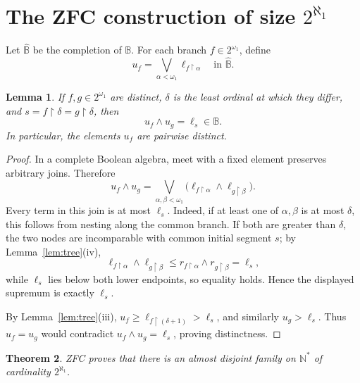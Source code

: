 \documentclass[11pt]{article}
\newtheorem{theorem}{Theorem}[section]
\newtheorem{lemma}[theorem]{Lemma}
\theoremstyle{definition}
\theoremstyle{remark}
\newcommand{\B}{\mathbb B}
\newcommand{\wideB}{\widehat{\mathbb B}}
\newcommand{\restr}{\mathbin{\upharpoonright}}
\begin{document}
\section{The ZFC construction of size
\texorpdfstring{\(2^{\aleph_1}\)}{2 to the aleph1}}

Let \(\wideB\) be the completion of \(\B\).  For each branch
\(f\in2^{\omega_1}\), define
\[
  u_f=\bigvee_{\alpha<\omega_1}\ell_{f\restr\alpha}
  \quad\text{in }\wideB.
\]

\begin{lemma}\label{lem:branchmeet}
If \(f,g\in2^{\omega_1}\) are distinct, \(\delta\) is the least ordinal at
which they differ, and \(s=f\restr\delta=g\restr\delta\), then
\[
  u_f\wedge u_g=\ell_s\in\B.
\]
In particular, the elements \(u_f\) are pairwise distinct.
\end{lemma}

\begin{proof}
In a complete Boolean algebra, meet with a fixed element preserves arbitrary
joins.  Therefore
\[
  u_f\wedge u_g
  =\bigvee_{\alpha,\beta<\omega_1}
     \bigl(\ell_{f\restr\alpha}
           \wedge\ell_{g\restr\beta}\bigr).
\]
Every term in this join is at most \(\ell_s\).  Indeed, if at least one of
\(\alpha,\beta\) is at most \(\delta\), this follows from nesting along the
common branch.  If both are greater than \(\delta\), the two nodes are
incomparable with common initial segment \(s\); by
Lemma~\ref{lem:tree}(iv),
\[
  \ell_{f\restr\alpha}\wedge\ell_{g\restr\beta}
  \leq r_{f\restr\alpha}\wedge r_{g\restr\beta}
  =\ell_s,
\]
while \(\ell_s\) lies below both lower endpoints, so equality holds.  Hence
the displayed supremum is exactly \(\ell_s\).

By Lemma~\ref{lem:tree}(iii),
\(u_f\geq\ell_{f\restr(\delta+1)}>\ell_s\), and similarly
\(u_g>\ell_s\).  Thus \(u_f=u_g\) would contradict
\(u_f\wedge u_g=\ell_s\), proving distinctness.
\end{proof}

\begin{theorem}\label{thm:main}
ZFC proves that there is an almost disjoint family on \(\mathbb N^*\) of
cardinality \(2^{\aleph_1}\).
\end{theorem}
\end{document}
